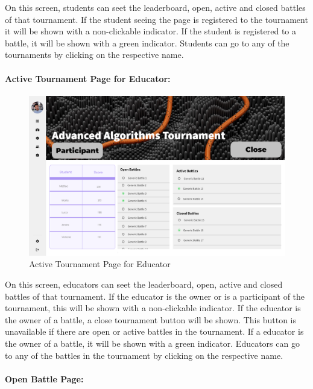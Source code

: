 \documentclass{article}
\begin{document}
On this screen, students can seet the leaderboard, open, active and closed battles of that tournament.
If the student seeing the page is registered to the tournament it will be shown with a non-clickable indicator.
If the student is registered to a battle, it will be shown with a green indicator. Students can go to any
of the tournaments by clicking on the respective name. 

\paragraph{Active Tournament Page for Educator:}

\begin{figure}[H]
    \centering
    \includegraphics[width=1\textwidth]{images/UI/Tournament Page Active Educator.png}
    \caption{Active Tournament Page for Educator}
    \label{fig:ActiveTournamentPageForEducator}
\end{figure}

On this screen, educators can seet the leaderboard, open, active and closed battles of that tournament.
If the educator is the owner or is a participant of the tournament, this will be shown with a non-clickable indicator.
If the educator is the owner of a battle, a close tournament button will be shown. This button is unavailable
if there are open or active battles in the tournament.
If a educator is the owner of a battle, it will be shown with a green indicator. Educators can go to any
of the battles in the tournament by clicking on the respective name.

\paragraph{Open Battle Page:}
\end{document}

